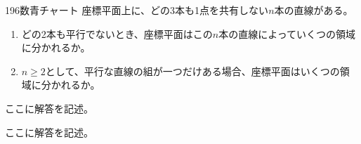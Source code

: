 \begin{prob}{196}{}{数青チャート}
 座標平面上に、どの3本も1点を共有しない$n$本の直線がある。
 \begin{enumerate}
  \item どの2本も平行でないとき、座標平面はこの$n$本の直線によっていくつの領域に分かれるか。
  \item $n\ge 2$として、平行な直線の組が一つだけある場合、座標平面はいくつの領域に分かれるか。
 \end{enumerate}
\end{prob}
ここに解答を記述。

ここに解答を記述。